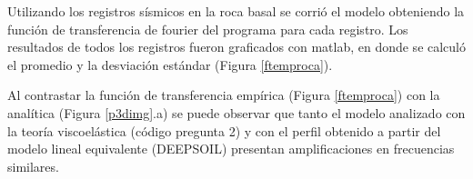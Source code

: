 Utilizando los registros sísmicos en la roca basal se corrió el modelo obteniendo la función de transferencia de fourier del programa para cada registro. Los resultados de todos los registros fueron graficados con matlab, en donde se calculó el promedio y la desviación estándar (Figura \ref{ftemproca}).


Al contrastar la función de transferencia empírica (Figura \ref{ftemproca}) con la analítica (Figura \ref{p3dimg}.a) se puede observar que tanto el modelo analizado con la teoría viscoelástica (código pregunta 2) y con el perfil obtenido a partir del modelo lineal equivalente (DEEPSOIL) presentan amplificaciones en frecuencias similares.

